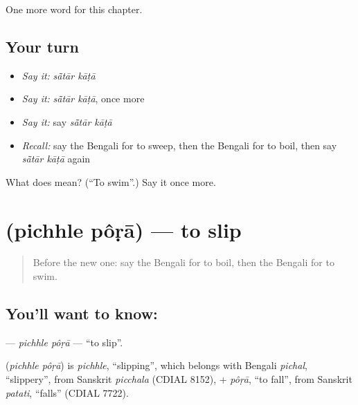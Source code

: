 \begin{grammarlens}[title={What you've built}]
One more word for this chapter.
\end{grammarlens}

\subsection*{Your turn}
\begin{itemize}
\raggedright
  \item \emph{Say it:} \emph{sā̃tār kāṭā}
  \item \emph{Say it:} \emph{sā̃tār kāṭā}, once more
  \item \emph{Say it:} say \emph{sā̃tār kāṭā}
  \item \emph{Recall:} say the Bengali for to sweep, then the Bengali for to boil, then say \emph{sā̃tār kāṭā} again
\end{itemize}

\begin{tcolorbox}[breakable,colback=teal!4,colframe=teal!35!black,title={Before you move on}]
What does   mean? (\textquotedblleft{}To swim\textquotedblright{}.) Say it once more.
\end{tcolorbox}
\section[\texorpdfstring{\bn{পিছলে} \bn{পড়া} (pichhle pôṛā)}{পিছলে পড়া (pichhle pôṛā)}]{  (pichhle pôṛā) — to slip}

\label{lesson:BN-C149-pichhle-pora}



\begin{quote}
Before the new one: say the Bengali for to boil, then the Bengali for to swim.
\end{quote}

\subsection*{You'll want to know:  }
\textbf{ } — \emph{pichhle pôṛā} — \textquotedblleft{}to slip\textquotedblright{}.

\begin{cousinweb}
\textbf{ } (\emph{pichhle pôṛā}) is \emph{pichhle}, \textquotedblleft{}slipping\textquotedblright{}, which belongs with Bengali \emph{pichal}, \textquotedblleft{}slippery\textquotedblright{}, from Sanskrit \emph{picchala} (CDIAL 8152), + \emph{pôṛā}, \textquotedblleft{}to fall\textquotedblright{}, from Sanskrit \emph{patati}, \textquotedblleft{}falls\textquotedblright{} (CDIAL 7722).
\end{cousinweb}

